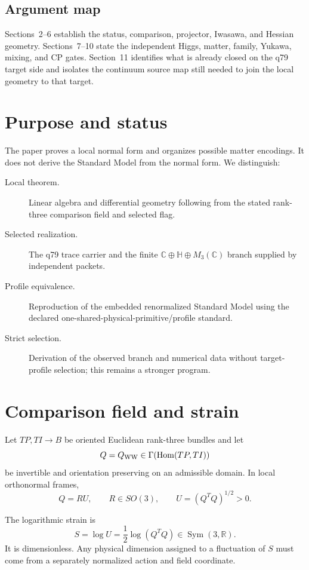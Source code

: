 \documentclass[11pt]{article}
\begin{document}
\subsection{Argument map}

Sections~2--6 establish the status, comparison, projector, Iwasawa, and
Hessian geometry.  Sections~7--10 state the independent Higgs, matter, family,
Yukawa, mixing, and CP gates.  Section~11 identifies what is already closed on the q79
target side and isolates the continuum source map still needed to join the
local geometry to that target.

\section{Purpose and status}

The paper proves a local normal form and organizes possible matter encodings.
It does not derive the Standard Model from the normal form.  We distinguish:
\begin{description}
\item[Local theorem.] Linear algebra and differential geometry following from
the stated rank-three comparison field and selected flag.
\item[Selected realization.] The q79 trace carrier and the finite
$\mathbb C\oplus\mathbb H\oplus M_3(\mathbb C)$ branch supplied by independent
packets.
\item[Profile equivalence.] Reproduction of the embedded renormalized Standard
Model using the declared one-shared-physical-primitive/profile standard.
\item[Strict selection.] Derivation of the observed branch and numerical data
without target-profile selection; this remains a stronger program.
\end{description}

\section{Comparison field and strain}

Let $TP,TI\to B$ be oriented Euclidean rank-three bundles and let
\[
 Q=Q_{\rm WW}\in\Gamma(\operatorname{Hom}(TP,TI))
\]
be invertible and orientation preserving on an admissible domain.  In local
orthonormal frames,
\[
 Q=RU,
 \qquad R\in SO(3),
 \qquad U=(Q^TQ)^{1/2}>0.
\]

\begin{definition}
The logarithmic strain is
\[
 S=\log U=\frac12\log(Q^TQ)
 \in\operatorname{Sym}(3,\mathbb R).
\]
It is dimensionless.  Any physical dimension assigned to a fluctuation of $S$
must come from a separately normalized action and field coordinate.
\end{definition}
\end{document}
